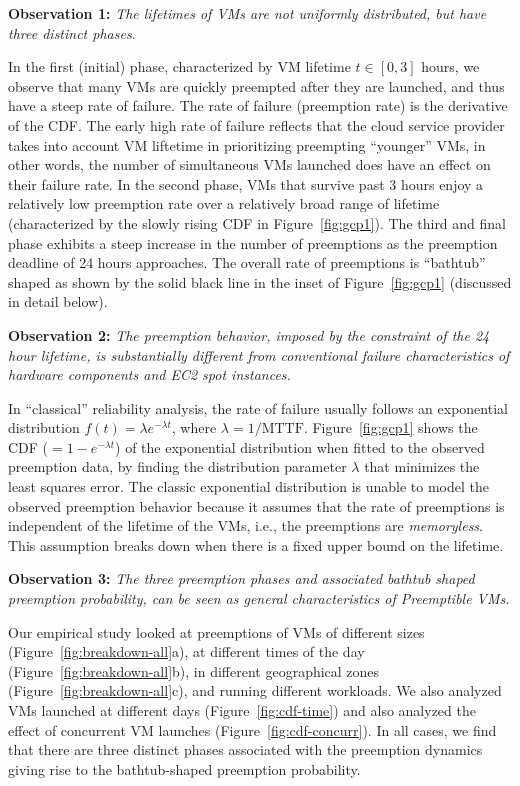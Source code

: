 \documentclass[compsoc]{IEEEtran}
\begin{document}
\noindent \textbf{Observation 1:} \emph{The lifetimes of VMs are not uniformly distributed, but have three distinct phases.}

\noindent In the first (initial) phase, characterized by VM lifetime $t\in [0, 3]$ hours, we observe that many VMs are quickly preempted after they are launched, and thus have a steep rate of failure. The rate of failure (preemption rate) is the derivative of the CDF.
The early high rate of failure reflects that the cloud service provider takes into account VM liftetime in prioritizing preempting ``younger'' VMs, in other words, the number of simultaneous VMs launched does have an effect on their failure rate. 
In the second phase, VMs that survive past 3 hours enjoy a relatively low preemption rate over a relatively broad range of lifetime (characterized by the slowly rising CDF in Figure~\ref{fig:gcp1}).
The third and final phase exhibits a steep increase in the number of preemptions as the preemption deadline of 24 hours approaches.
The overall rate of preemptions is ``bathtub'' shaped as shown by the solid black line in the inset of Figure~\ref{fig:gcp1} (discussed in detail below).



\noindent \textbf{Observation 2:} \emph{The preemption behavior, imposed by the constraint of the 24 hour lifetime, is substantially different from conventional failure characteristics of hardware components and EC2 spot instances.}

\noindent In ``classical'' reliability analysis, the rate of failure  usually follows an exponential distribution $f(t) = \lambda e^{-\lambda t}$, where $\lambda=1/\text{MTTF}$.
Figure~\ref{fig:gcp1} shows the CDF ($=1-e^{-\lambda t}$) of the exponential distribution when fitted to the observed preemption data, by finding the distribution parameter $\lambda$ that minimizes the least squares error.
The classic exponential distribution is unable to model the observed preemption behavior because it assumes that the rate of preemptions is independent of the lifetime of the VMs, i.e., the preemptions are \emph{memoryless}.
This assumption breaks down when there is a fixed upper bound on the lifetime. 

\noindent \textbf{Observation 3:} \emph{The three preemption phases and associated bathtub shaped preemption probability, can be seen as general characteristics of Preemptible VMs.}

Our empirical study looked at preemptions of VMs of different sizes (Figure~\ref{fig:breakdown-all}a), at different times of the day (Figure~\ref{fig:breakdown-all}b), in different geographical zones (Figure~\ref{fig:breakdown-all}c), and running different workloads.
We also analyzed VMs launched at different days (Figure~\ref{fig:cdf-time}) and also analyzed the effect of concurrent VM launches (Figure~\ref{fig:cdf-concurr}).
In all cases, we find that there are three distinct phases associated with the preemption dynamics giving rise to the bathtub-shaped preemption probability. 
\end{document}
